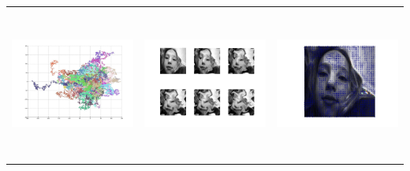 \begin{tabular}{ |c|c|c| }
\includegraphics[width=5.0cm,height=5.0cm]{images/RandomWalk_50_Walkers.jpg}                           &
\includegraphics[width=5.0cm,height=5.0cm]{images/Raymond_AdvectiveNavierStokesdiffusion.jpg}           &
\includegraphics[width=5.0cm,height=5.0cm]{images/Raymond_TensorField.jpg}
\end{tabular}

